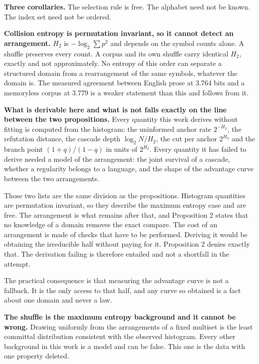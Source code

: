 \textbf{Three corollaries.} The selection rule is free. The alphabet need not be known. The index set need not be ordered.

\textbf{Collision entropy is permutation invariant, so it cannot detect an arrangement.} \(H_2\) is \(-\log_2 \sum p^2\) and depends on the symbol counts alone. A shuffle preserves every count. A corpus and its own shuffle carry identical \(H_2\), exactly and not approximately. No entropy of this order can separate a structured domain from a rearrangement of the same symbols, whatever the domain is. The measured agreement between English prose at 3.764 bits and a memoryless corpus at 3.779 is a weaker statement than this and follows from it.

\textbf{What is derivable here and what is not falls exactly on the line between the two propositions.} Every quantity this work derives without fitting is computed from the histogram: the uninformed anchor rate \(2^{-H_2}\), the refutation distance, the cascade depth \(\log_2 N / H_2\), the cut per anchor \(2^{H_2}\) and the branch point \((1+q)/(1-q)\) in units of \(2^{H_2}\). Every quantity it has failed to derive needed a model of the arrangement: the joint survival of a cascade, whether a regularity belongs to a language, and the shape of the advantage curve between the two arrangements.

Those two lists are the same division as the propositions. Histogram quantities are permutation invariant, so they describe the maximum entropy case and are free. The arrangement is what remains after that, and Proposition 2 states that no knowledge of a domain removes the exact compare. The cost of an arrangement is made of checks that have to be performed. Deriving it would be obtaining the irreducible half without paying for it. Proposition 2 denies exactly that. The derivation failing is therefore entailed and not a shortfall in the attempt.

The practical consequence is that measuring the advantage curve is not a fallback. It is the only access to that half, and any curve so obtained is a fact about one domain and never a law.

\textbf{The shuffle is the maximum entropy background and it cannot be wrong.} Drawing uniformly from the arrangements of a fixed multiset is the least committal distribution consistent with the observed histogram. Every other background in this work is a model and can be false. This one is the data with one property deleted.

